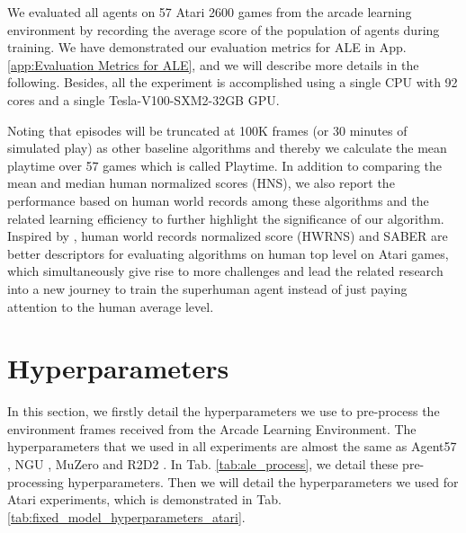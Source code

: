 \documentclass[nohyperref]{article}
\theoremstyle{plain}
\begin{document}
We evaluated all agents on 57 Atari 2600 games from the arcade learning environment  \citep[ALE]{ale} by recording the average score of the population of agents during training. We have demonstrated our evaluation metrics for ALE in App. \ref{app:Evaluation Metrics for ALE}, and we will describe more details in the following. Besides, all the experiment is accomplished using a single CPU with 92 cores and a single Tesla-V100-SXM2-32GB GPU.

Noting that episodes will be truncated at 100K frames (or 30 minutes of simulated play) as other baseline algorithms \citep{rainbow,agent57,laser,ngu,r2d2} and thereby we calculate the mean playtime over 57 games which is called Playtime. In addition to comparing the mean and median human normalized scores (HNS), we also report the performance based on human world records among these algorithms and the related learning efficiency to further highlight the significance of our algorithm. Inspired by \citep{atarihuman}, human world records normalized score (HWRNS) and SABER are  better descriptors for evaluating algorithms on human top level on Atari games, which simultaneously give rise to more challenges and lead the related research into a new journey to train the superhuman agent instead of  just paying attention to  the human average level. 


\clearpage
\section{Hyperparameters}
\label{Sec: appendix hyperparameters}

In this section, we firstly detail the hyperparameters we use to pre-process the environment frames received from the Arcade Learning Environment. The hyperparameters that we used in all experiments are almost the same as Agent57  \citep{agent57}, NGU \citep{ngu}, MuZero \citep{muzero} and R2D2 \citep{r2d2}.
In Tab. \ref{tab:ale_process}, we detail these pre-processing hyperparameters. Then we will detail the hyperparameters we used for Atari experiments, which is demonstrated in Tab. \ref{tab:fixed_model_hyperparameters_atari}. 
\end{document}
